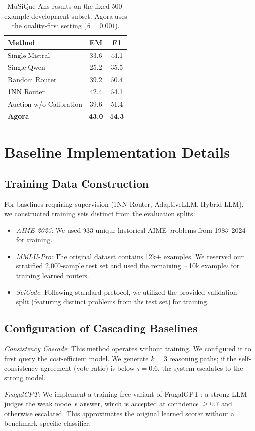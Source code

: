 \documentclass[11pt]{article}
\begin{document}
\begin{table}[ht]
    \centering
    \caption{MuSiQue-Ans results on the fixed 500-example development subset. Agora uses the quality-first setting ($\beta=0.001$).}
    \label{tab:musique_appendix}
    \small
    \begin{tabular}{lcc}
        \toprule
        \textbf{Method} & \textbf{EM} & \textbf{F1} \\
        \midrule
        Single Mistral & 33.6 & 44.1 \\
        Single Qwen & 25.2 & 35.5 \\
        Random Router & 39.2 & 50.4 \\
        1NN Router & \underline{42.4} & \underline{54.1} \\
        Auction w/o Calibration & 39.6 & 51.4 \\
        \textbf{Agora} & \textbf{43.0} & \textbf{54.3} \\
        \bottomrule
    \end{tabular}
\end{table}

\section{Baseline Implementation Details}
\label{app:baselines}

\subsection{Training Data Construction}
For baselines requiring supervision (1NN Router, AdaptiveLLM, Hybrid LLM), we constructed training sets distinct from the evaluation splits:
\begin{itemize}
    \item \emph{AIME 2025}: We used 933 unique historical AIME problems from 1983--2024 for training.
    \item \emph{MMLU-Pro}: The original dataset contains 12k+ examples. We reserved our stratified 2,000-sample test set and used the remaining $\sim$10k examples for training learned routers.
    \item \emph{SciCode}: Following standard protocol, we utilized the provided validation split (featuring distinct problems from the test set) for training.
\end{itemize}

\subsection{Configuration of Cascading Baselines}
\noindent\emph{Consistency Cascade}: This method operates without training. We configured it to first query the cost-efficient model. We generate $k=3$ reasoning paths; if the self-consistency agreement (vote ratio) is below $\tau=0.6$, the system escalates to the strong model.

\noindent\emph{FrugalGPT}: We implement a training-free variant of FrugalGPT \citep{chen2023frugalgptuselargelanguage}: a strong LLM judges the weak model's answer, which is accepted at confidence $\ge 0.7$ and otherwise escalated. This approximates the original learned scorer without a benchmark-specific classifier.
\end{document}
